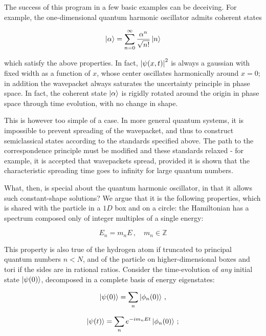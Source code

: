 \documentclass{article}
\begin{document}
The success of this program in a few basic examples can be deceiving. For example, the one-dimensional quantum harmonic oscillator admits coherent states

\begin{equation}
    \ket\alpha = \sum_{n=0}^{\infty} \frac{\alpha^n}{\sqrt{n!}} \ket n
\end{equation}

which satisfy the above properties. In fact, $\abs{\psi(x,t)}^2$ is always a gaussian with fixed width as a function of $x$, whose center oscillates harmonically around $x=0$; in addition the wavepacket always saturates the uncertainty principle in phase space. In fact, the coherent state $\ket \alpha$ is rigidly rotated around the origin in phase space through time evolution, with no change in shape.

This is however too simple of a case. In more general quantum systems, it is impossible to prevent spreading of the wavepacket, and thus to construct semiclassical states according to the standards specified above. The path to the correspondence principle must be modified and these standards relaxed - for example, it is accepted that wavepackets spread, provided it is shown that the characteristic spreading time goes to infinity for large quantum numbers.

What, then, is special about the quantum harmonic oscillator, in that it allows such constant-shape solutions? We argue that it is the following properties, which is shared with the particle in a $1D$ box and on a circle: the Hamiltonian has a spectrum composed only of integer multiples of a single energy:

\begin{equation}
    E_n = m_n E\,,\quad m_n \in \mathbb{Z}
\end{equation}

This property is also true of the hydrogen atom if truncated to principal quantum numbers $n < N$, and of the particle on higher-dimensional boxes and tori if the sides are in rational ratios. Consider the time-evolution of \emph{any} initial state $\ket{\psi(0)}$, decomposed in a complete basis of energy eigenstates:

\begin{equation}
    \ket{\psi(0)} = \sum_n \ket{\phi_n(0)}\,,
\end{equation}

\begin{equation}
    \ket{\psi(t)} = \sum_n e^{-i m_n E t} \ket{\phi_n(0)}\,;
\end{equation}
\end{document}
